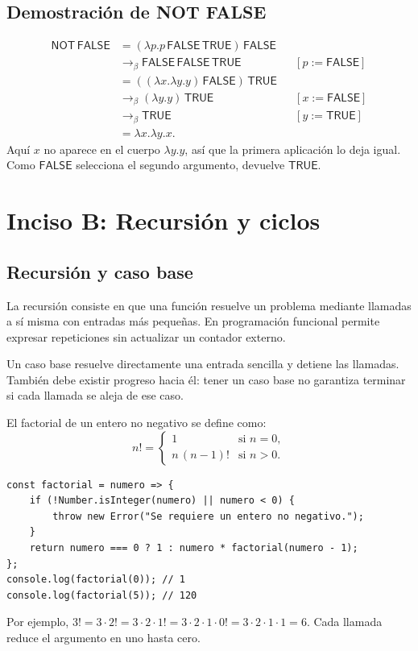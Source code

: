 \documentclass[11pt,a4paper]{article}
\newcommand{\TRUE}{\mathsf{TRUE}}
\newcommand{\FALSE}{\mathsf{FALSE}}
\newcommand{\NOT}{\mathsf{NOT}}
\begin{document}
\subsection{Demostración de NOT FALSE}
\begin{align*}
    \NOT\,\FALSE
    &= (\lambda p.p\,\FALSE\,\TRUE)\,\FALSE \\
    &\longrightarrow_\beta \FALSE\,\FALSE\,\TRUE
        && [p:=\FALSE] \\
    &= ((\lambda x.\lambda y.y)\,\FALSE)\,\TRUE \\
    &\longrightarrow_\beta (\lambda y.y)\,\TRUE
        && [x:=\FALSE] \\
    &\longrightarrow_\beta \TRUE
        && [y:=\TRUE] \\
    &= \lambda x.\lambda y.x.
\end{align*}
Aquí $x$ no aparece en el cuerpo $\lambda y.y$, así que la primera aplicación
lo deja igual. Como $\FALSE$ selecciona el segundo argumento, devuelve $\TRUE$.

\newpage
\section{Inciso B: Recursión y ciclos}
\subsection{Recursión y caso base}
La recursión consiste en que una función resuelve un problema mediante
llamadas a sí misma con entradas más pequeñas. En programación funcional
permite expresar repeticiones sin actualizar un contador externo.

Un caso base resuelve directamente una entrada sencilla y detiene las
llamadas. También debe existir progreso hacia él: tener un caso base no
garantiza terminar si cada llamada se aleja de ese caso.

El factorial de un entero no negativo se define como:
\[
    n! = \begin{cases}
        1 & \text{si } n=0,\\
        n\,(n-1)! & \text{si } n>0.
    \end{cases}
\]
\begin{lstlisting}
const factorial = numero => {
    if (!Number.isInteger(numero) || numero < 0) {
        throw new Error("Se requiere un entero no negativo.");
    }
    return numero === 0 ? 1 : numero * factorial(numero - 1);
};
console.log(factorial(0)); // 1
console.log(factorial(5)); // 120
\end{lstlisting}
Por ejemplo, $3!=3\cdot2!=3\cdot2\cdot1!=3\cdot2\cdot1\cdot0!
=3\cdot2\cdot1\cdot1=6$. Cada llamada reduce el argumento en uno hasta cero.
\end{document}
